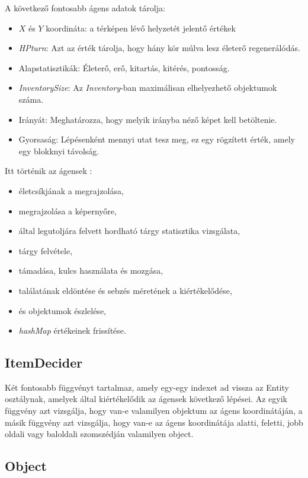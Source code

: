 A következő fontosabb ágens adatok tárolja:
\begin{itemize}
    \item $X$ és $Y$ koordináta: a térképen lévő helyzetét jelentő értékek
    \item \textit{HPturn}: Azt az érték tárolja, hogy hány kör múlva lesz életerő regenerálódás.
    \item Alapstatisztikák: Életerő, erő, kitartás, kitérés, pontosság.
    \item \textit{InventorySize}: Az \textit{Inventory}-ban maximálisan elhelyezhető objektumok száma.
    \item Irányát: Meghatározza, hogy melyik irányba néző képet kell betöltenie.
    \item Gyorsaság: Lépésenként mennyi utat tesz meg, ez egy rögzített érték, amely egy blokknyi távolság.
\end{itemize}

\noindent Itt történik az ágensek :
\begin{itemize}
    \item életcsíkjának a megrajzolása,
    \item megrajzolása a képernyőre,
    \item által legutoljára felvett hordható tárgy statisztika vizsgálata,
    \item tárgy felvétele,
    \item támadása, kulcs használata és mozgása,
    \item találatának eldöntése és sebzés méretének a kiértékelődése,
    \item és objektumok észlelése,
    \item \textit{hashMap} értékeinek frissítése.
\end{itemize} 

\subsection{ItemDecider}

Két fontosabb függvényt tartalmaz, amely egy-egy indexet ad vissza az Entity osztálynak, amelyek által kiértékelődik az ágensek következő lépései.
Az egyik függvény azt vizsgálja, hogy van-e valamilyen objektum az ágens koordinátáján, a másik függvény azt vizsgálja, hogy van-e az ágens koordinátája
alatti, feletti, jobb oldali vagy baloldali szomszédján valamilyen object.

\subsection{Object}

